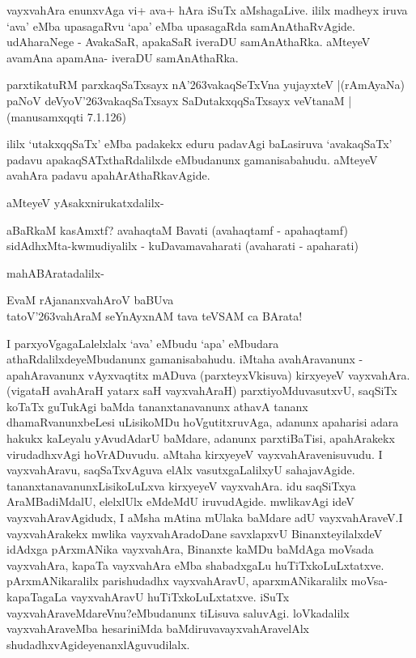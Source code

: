 vayxvahAra enunxvAga vi+ ava+ hAra iSuTx aMshagaLive. ililx madheyx iruva `ava' eMba upasagaRvu `apa' eMba upasagaRda samAnAthaRvAgide. udAharaNege - AvakaSaR, apakaSaR iveraDU samA\-nAthaRka. aMteyeV avamAna apamAna- iveraDU samAnAthaRka.

\begin{shloka}
parxtikatuRM parxkaqSaTxsayx nA\char'263vakaqSeTxVna yujayxteV |\hfill{(rAmAyaNa)}\\\label{223}
paNoV deVyoV\char'263vakaqSaTxsayx SaDutakxqqSaTxsayx veVtanaM | \hfill{(manusamxqqti 7.1.126)}\label{223}
\end{shloka}

ililx `utakxqqSaTx' eMba padakekx eduru padavAgi baLasiruva `avakaqSaTx' padavu apakaqSATxthaRdalilxde eMbu\-danunx gamanisabahudu. aMteyeV avahAra padavu apahArAthaRkavAgide.

aMteyeV yAsakxnirukatxdalilx-

\begin{shloka}
aBaRkaM kasAmxtf? avahaqtaM Bavati (avahaqtamf - apahaqtamf)\\\label{224}
sidAdhxMta-kwmudiyalilx - kuDavamavaharati (avaharati - apaharati)\\
\end{shloka}
mahABAratadalilx- 
\begin{shloka}
EvaM rAjananxvahAroV baBUva\\\label{224}
tatoV\char'263vahAraM seYnAyxnAM tava teVSAM ca BArata!
\end{shloka}

I parxyoVgagaLalelxlalx `ava' eMbudu `apa' eMbudara athaRdalilxde\-yeMbu\-danunx gamanisa\-bahudu. iMtaha avahAravanunx - apahAravanunx vAyxvaqtitx mADuva (parxteyxVkisuva) kirxyeyeV vayxvahAra. (vigataH ava\-hAraH yatarx saH vayxvahAraH) parxtiyoMdu\break vasutxvU, saqSiTx koTaTx guTukAgi baMda tananxtanavanunx athavA tananx dhamaRvanunx\break beLesi uLisikoMDu hoVgutitxruvAga, adanunx apaharisi adara hakukx kaLeyalu yAvu\-dAdarU baMdare, adanunx parxtiBaTisi, apahArakekx virudadhxvAgi hoVrADuvudu. aMtaha kirxyeyeV vayxvahAravenisuvudu. I vayxvahAravu, saqSaTxvAguva elAlx vasutxgaLalilxyU sahajavAgide. tananxtanava\-nunxLisikoLuLxva kirxyeyeV vayxva\-hAra. idu saqSiTxya AraMBadiMdalU, elelxlUlx eMdeMdU iruvu\-dAgide. mwlika\-vAgi ideV vayxvahAravAgidudx, I aMsha mAtina mUlaka baMdare adU vayxvahA\-raveV.\break I vayxvahArakekx mwlika vayxvahAradoDane savxlapxvU BinanxteyilalxdeV idAdxga pArxmA\-Nika vayxvahAra, Binanxte kaMDu baMdAga moVsada vayxvahAra, kapaTa vayxvahAra eMba shabadxgaLu huTiTxkoLuLxtatxve. pArxmANi\-karalilx parishudadhx vayxvahAravU, aparxmANika\-ralilx moVsa-kapaTagaLa vayxvahAravU huTiTxkoLuLxtatxve. iSuTx vayxva\-hAraveMdareVnu?\break eMbu\-danunx tiLisuva saluvAgi. loVkadalilx vayxvahAraveMba hesariniMda baMdiruva\break vayxvahAravelAlx shudadhxvAgideyenanxlAguvudilalx.

